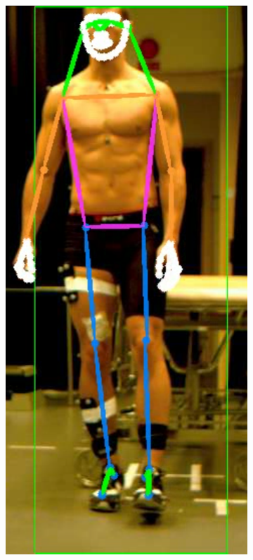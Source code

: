 {\begin{figure}[h]
\begin{subfigure}[t]{0.22\textwidth}
    \includegraphics[height=1.3\textwidth]{files/figs/res/hpe/36-2.png}
    \caption{}
  \end{subfigure}
  ~
  \begin{subfigure}[t]{0.22\textwidth}
    \centering

\end{subfigure}
\end{figure}}
